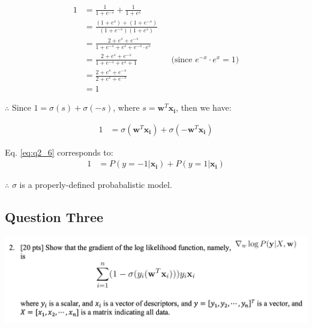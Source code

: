 \begin{align}
    1 &= \frac{1}{1+e^{-s}} + \frac{1}{1+e^{s}}  \label{eq:q2_5} \nonumber \\
    &= \frac{(1+e^{s})+(1+e^{-s})}{(1+e^{-s})(1+e^{s})} \nonumber \\
    &= \frac{2+e^{s}+e^{-s}}{1+e^{-s}+e^{s}+e^{-s} \cdot e^{s}} \nonumber \\
    &= \frac{2+e^{s}+e^{-s}}{1+e^{-s}+e^{s}+1} && \text{(since $e^{-x} \cdot e^{x} = 1$)}\nonumber \\
    &= \frac{2+e^{s}+e^{-s}}{2+e^{s}+e^{-s}} \nonumber \\
    &=1
\end{align}

$\therefore$ Since $1 = \sigma(s) + \sigma(-s)$, where $s = \mathbf{w}^T \mathbf{x_i}$, then we have:

\begin{align}
    1 &= \sigma(\mathbf{w}^T \mathbf{x_i}) + \sigma(-\mathbf{w}^T \mathbf{x_i})  \label{eq:q2_6} 
\end{align}

Eq. \ref{eq:q2_6} corresponds to:
\begin{align}
    1 &= P(y=-1 | \mathbf{x_i}) + P(y=1 | \mathbf{x_i})  \label{eq:q2_7} 
\end{align}

$\therefore$ $\sigma$ is a properly-defined probabalistic model.

\subsection{Question Three}
\includegraphics[width=1\textwidth]{media/hw4_q3.png}